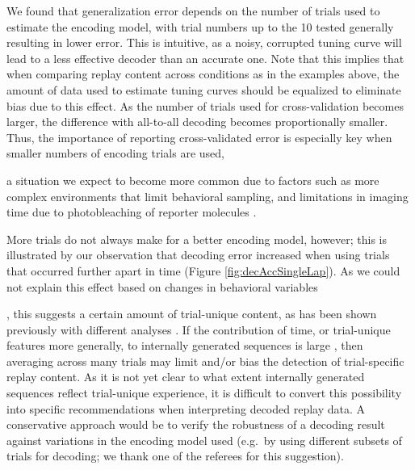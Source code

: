 \documentclass[11pt]{article}
\let\cite=\citep
\begin{document}
We found that generalization error depends on the number of trials
used to estimate the encoding model, with trial numbers up to the 10
tested generally resulting in lower error. {\color{red} This is
  intuitive, as a noisy, corrupted tuning curve will lead to a less
  effective decoder than an accurate one. Note that this implies that
  when comparing replay content across conditions as in the examples
  above, the amount of data used to estimate tuning curves should be
  equalized to eliminate bias due to this effect}. As the number of trials used
for cross-validation becomes larger, the difference with all-to-all
decoding becomes proportionally smaller. Thus, the importance of
reporting cross-validated error is especially key when smaller numbers
of encoding trials are used, {\color{red} a situation we expect to
  become more common due to factors such as more complex environments
  that limit behavioral sampling, and limitations in imaging time
  due to photobleaching of reporter molecules \cite{Rubin2015,Malvache2016}.

More trials do not always make for a better encoding model, however;
this is illustrated by our observation that decoding error increased
when using trials that occurred further apart in time (Figure
\ref{fig:decAccSingleLap}). As we could not explain this effect based
on changes in behavioral variables}, this suggests a certain amount of
trial-unique content, as has been shown previously with different
analyses \cite{Manns2007,Mankin2012,Ziv2013a}. If the contribution of
time, or trial-unique features more generally, to internally generated
sequences is large \cite{takahashi2015,Schwindel2016a}, then averaging
across many trials may limit and/or bias the detection of
trial-specific replay content. {\color{red} As it is not yet
  clear to what extent internally generated sequences reflect
  trial-unique experience, it is difficult to convert this possibility
  into specific recommendations when interpreting decoded replay
  data. A conservative approach would be to verify the robustness of
  a decoding result against variations in the encoding model used
  (e.g.\ by using different subsets of trials for decoding; we thank
  one of the referees for this suggestion).}
\end{document}
